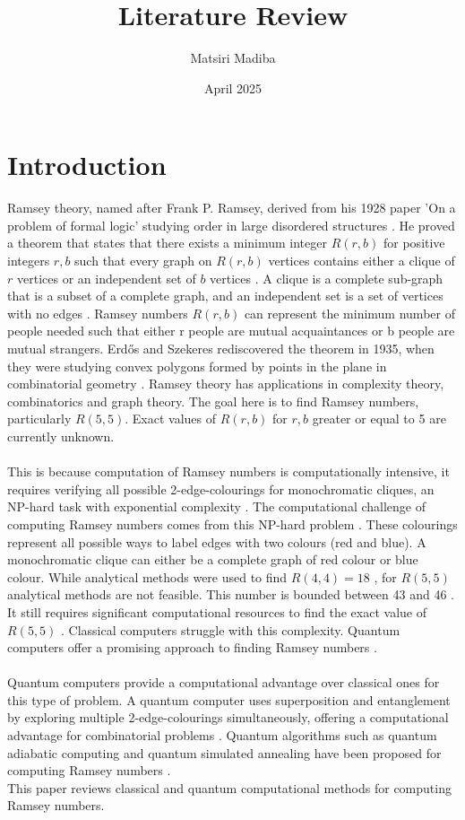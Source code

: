 \documentclass{Assignment}
\author{Matsiri Madiba}
\date{April 2025}
\title{Literature Review}
\begin{document}
\maketitle
\section{Introduction}
Ramsey theory, named after Frank P. Ramsey, derived from his 1928 paper 'On a problem of formal logic' studying order in large disordered structures \cite{graham1980ramsey}.
He proved a theorem that states that there exists a minimum integer $R(r,b)$ for positive integers $r, b$ such that every graph on $R(r,b)$ vertices contains either a clique of $r$ vertices or an independent set of $b$ vertices \cite{BondyMurty2008}.
A clique is a complete sub-graph that is a subset of a complete graph, and an independent set is a set of vertices with no edges \cite{BondyMurty2008}.	
Ramsey numbers $R(r,b)$ can represent the minimum number of people needed such that either r people are mutual acquaintances or b people are mutual strangers.
Erd\H{o}s and Szekeres rediscovered the theorem in 1935, when they were studying convex polygons formed by points in the plane in combinatorial geometry \cite{BondyMurty2008}.
Ramsey theory has applications in complexity theory, combinatorics and graph theory. 
The goal here is to find Ramsey numbers, particularly $R(5,5)$.
Exact values of $R(r,b)$ for $r,b$ greater or equal to 5 are currently unknown.
\\\\
This is because computation of Ramsey numbers is computationally intensive, it requires verifying all possible 2-edge-colourings for monochromatic cliques, an NP-hard task with exponential complexity \cite{PhysRevA.93.032301, burr1981generalized}.
The computational challenge of computing Ramsey numbers comes from this NP-hard problem \cite{burr1981generalized}.
These colourings represent all possible ways to label edges with two colours (red and blue).
A monochromatic clique can either be a complete graph of red colour or blue colour.
While analytical methods were used to find $R(4,4)=18$ \cite{GreenwoodGleason1955},
for $R(5,5)$ analytical methods are not feasible.
This number is bounded between 43 \cite{Exoo1993} and 46 \cite{angeltveit2024r55le46}.
It still requires significant computational resources to find the exact value of $R(5,5)$ \cite{spencer1994}.
Classical computers struggle with this complexity.
Quantum computers offer a promising approach to finding Ramsey numbers \cite{PhysRevA.93.032301}.
\\\\
Quantum computers provide a computational advantage over classical ones for this type of problem.
A quantum computer uses superposition and entanglement by exploring multiple 2-edge-colourings simultaneously, offering a computational advantage for combinatorial problems  \cite{Deutsch1989,PhysRevA.93.032301}.
Quantum algorithms such as quantum adiabatic computing and quantum simulated annealing have been proposed for computing Ramsey numbers \cite{gaitan2012ramsey, PhysRevA.93.032301}.
\\
This paper reviews classical and quantum computational methods for computing Ramsey numbers.
\end{document}
